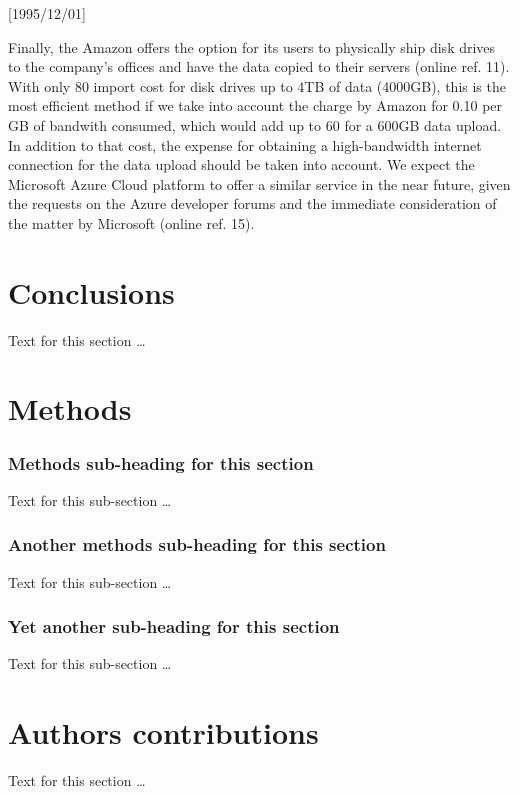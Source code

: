 \NeedsTeXFormat{LaTeX2e}[1995/12/01] \documentclass[10pt]{bmc_article}
\newenvironment{bmcformat}{\begin{raggedright}\baselineskip20pt\sloppy\setboolean{publ}{false}}{\end{raggedright}\baselineskip20pt\sloppy}
\begin{document}
\begin{bmcformat}
Finally, the Amazon offers the option for its users to physically ship disk drives to the company's offices
and have the data copied to their servers (online ref. 11). With only 80 import cost for disk drives up to 4TB
of data (4000GB), this is the most efficient method if we take into account the charge by Amazon for 0.10 per
GB of bandwith consumed, which would add up to 60 for a 600GB data upload. In addition to that cost, the
expense for obtaining a high-bandwidth internet connection for the data upload should be taken into account.
We expect the Microsoft Azure Cloud platform to offer a similar service in the near future, given the requests
on the Azure developer forums and the immediate consideration of the matter by Microsoft (online ref. 15).



\section*{Conclusions} Text for this section \ldots



\section*{Methods} \subsubsection*{Methods sub-heading for this section} Text for this sub-section \ldots

\subsubsection*{Another methods sub-heading for this section} Text for this sub-section \ldots

\subsubsection*{Yet another sub-heading for this section} Text for this sub-section \ldots



\section*{Authors contributions} Text for this section \ldots




\end{bmcformat}
\end{document}
